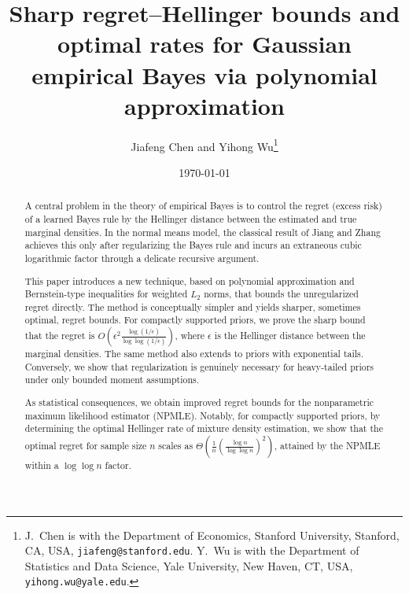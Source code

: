 \documentclass[letterpaper,11pt]{article}
\theoremstyle{definition}
\begin{document}
    \ifpdf
    \graphicspath{{figures/}{plots/}}
    \fi

    \title{Sharp regret--Hellinger bounds and optimal rates for Gaussian empirical
    Bayes via polynomial approximation}
    \author{Jiafeng Chen and Yihong Wu\thanks{
J.~Chen is with the Department of Economics, Stanford University, Stanford, CA, USA, \texttt{jiafeng@stanford.edu}.
Y.~Wu is with the Department of Statistics and Data Science, Yale University, New Haven, CT, USA,
\texttt{yihong.wu@yale.edu}.
}}
\date{\today}

\maketitle

\begin{abstract}
A central problem in the theory of empirical Bayes is to control the regret (excess risk) of a
learned Bayes rule by the Hellinger distance between the estimated and true marginal
  densities. In the normal means model, the classical result of Jiang and Zhang 
  \cite{JiangZhang2009} achieves this only after regularizing the Bayes rule and incurs an extraneous cubic logarithmic factor through a delicate recursive argument.
  
  This paper introduces a new technique, based on polynomial approximation and
   Bernstein-type inequalities for weighted $L_2$ norms, that bounds the unregularized
   regret directly. The method is conceptually simpler and yields sharper, sometimes
   optimal, regret bounds. For compactly supported priors, we prove the sharp bound that
   the regret is  $O(\epsilon^2   \frac{\log(1/\epsilon)}{\log\log(1/\epsilon)})$,
   where $\epsilon$ is the Hellinger distance between the marginal densities. The same
   method also extends to priors with exponential tails. Conversely, we show that
   regularization is genuinely necessary for heavy-tailed priors under only bounded moment
   assumptions. 
	
	As statistical consequences, we obtain improved regret bounds for the
   nonparametric maximum likelihood estimator (NPMLE). 
	Notably, for compactly supported priors, 
	by determining the optimal Hellinger rate of mixture density estimation, we show that the optimal regret for sample size $n$ scales as $\Theta(\frac{1}{n}
(\frac{\log n}{\log\log n})^2)$, attained by the NPMLE within a $\log\log n$ factor.
\end{abstract}


\tableofcontents
\end{document}
